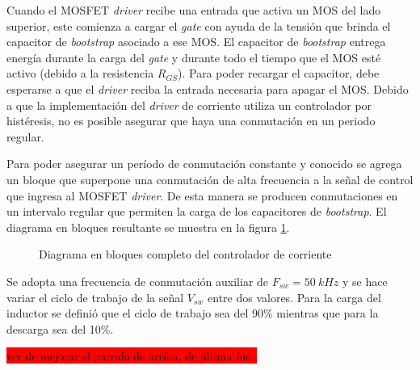 \noindent Cuando el MOSFET \textsl{driver} recibe una entrada que activa un MOS del lado superior, este comienza a cargar el \textsl{gate} con ayuda de la tensión que brinda el capacitor de \textsl{bootstrap} asociado a ese MOS. El capacitor de \textsl{bootstrap} entrega energía durante la carga del \textsl{gate} y durante todo el tiempo que el MOS esté activo (debido a la resistencia $R_{GS}$). Para poder recargar el capacitor, debe esperarse a que el \textsl{driver} reciba la entrada necesaria para apagar el MOS. Debido a que la implementación del \textsl{driver} de corriente utiliza un controlador por histéresis, no es posible asegurar que haya una conmutación en un periodo regular.

\noindent Para poder asegurar un período de conmutación constante y conocido se agrega un bloque que superpone una conmutación de alta frecuencia a la señal de control que ingresa al MOSFET \textsl{driver}. De esta manera se producen conmutaciones en un intervalo regular que permiten la carga de los capacitores de \textsl{bootstrap}. El diagrama en bloques resultante se muestra en la figura \ref{fig:img_diag-en-bloques-con-oscilador}. 

\begin{figure}[H]
	\centering
	\scalebox{0.8}{}
	\caption{Diagrama en bloques completo del controlador de corriente}	\label{fig:img_diag-en-bloques-con-oscilador}
\end{figure}

\noindent Se adopta una frecuencia de conmutación auxiliar de $F_{sw}=50\:kHz$ y se hace variar el ciclo de trabajo de la señal $V_{sw}$ entre dos valores. Para la carga del inductor se definió que el ciclo de trabajo sea del 90\% mientras que para la descarga sea del 10\%.

\colorbox{red}{ver de mejorar el parrafo de arriba, de última fue..}

%



